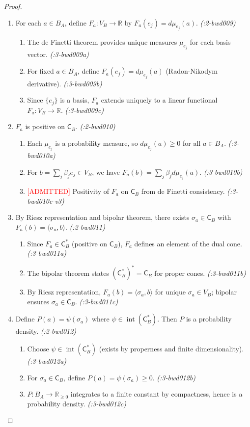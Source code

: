 \documentclass[11pt,a4paper]{article}
\theoremstyle{definition}
\theoremstyle{plain}
\newcommand{\proofstep}[2]{\item[$\langle #1 \rangle$#2.]}
\DeclareMathOperator{\inte}{int}
\newcommand{\C}{\mathsf{C}}
\begin{document}
\begin{proof}
\begin{enumerate}[leftmargin=2em]
\proofstep{1}{9} For each $a \in B_A$, define $F_a: V_B \to \mathbb{R}$ by $F_a(e_j) = d\mu_{e_j}(a)$. \textit{(:2-bwd009)}
\begin{enumerate}[leftmargin=1.5em, label=$\langle 2.\alph* \rangle$]
\item The de Finetti theorem provides unique measures $\mu_{e_j}$ for each basis vector. \textit{(:3-bwd009a)}
\item For fixed $a \in B_A$, define $F_a(e_j) = d\mu_{e_j}(a)$ (Radon-Nikodym derivative). \textit{(:3-bwd009b)}
\item Since $\{e_j\}$ is a basis, $F_a$ extends uniquely to a linear functional $F_a: V_B \to \mathbb{R}$. \textit{(:3-bwd009c)}
\end{enumerate}

\proofstep{1}{10} $F_a$ is positive on $\C_B$. \textit{(:2-bwd010)}
\begin{enumerate}[leftmargin=1.5em, label=$\langle 2.\alph* \rangle$]
\item Each $\mu_{e_j}$ is a probability measure, so $d\mu_{e_j}(a) \geq 0$ for all $a \in B_A$. \textit{(:3-bwd010a)}
\item For $b = \sum_j \beta_j e_j \in V_B$, we have $F_a(b) = \sum_j \beta_j d\mu_{e_j}(a)$. \textit{(:3-bwd010b)}
\item \textcolor{red}{[ADMITTED]} Positivity of $F_a$ on $\C_B$ from de Finetti consistency. \textit{(:3-bwd010c-v3)}
\end{enumerate}

\proofstep{1}{11} By Riesz representation and bipolar theorem, there exists $\sigma_a \in \C_B$ with $F_a(b) = \langle \sigma_a, b \rangle$. \textit{(:2-bwd011)}
\begin{enumerate}[leftmargin=1.5em, label=$\langle 2.\alph* \rangle$]
\item Since $F_a \in \C_B^*$ (positive on $\C_B$), $F_a$ defines an element of the dual cone. \textit{(:3-bwd011a)}
\item The bipolar theorem states $(\C_B^*)^* = \C_B$ for proper cones. \textit{(:3-bwd011b)}
\item By Riesz representation, $F_a(b) = \langle \sigma_a, b \rangle$ for unique $\sigma_a \in V_B$; bipolar ensures $\sigma_a \in \C_B$. \textit{(:3-bwd011c)}
\end{enumerate}

\proofstep{1}{12} Define $P(a) = \psi(\sigma_a)$ where $\psi \in \inte(\C_B^*)$. Then $P$ is a probability density. \textit{(:2-bwd012)}
\begin{enumerate}[leftmargin=1.5em, label=$\langle 2.\alph* \rangle$]
\item Choose $\psi \in \inte(\C_B^*)$ (exists by properness and finite dimensionality). \textit{(:3-bwd012a)}
\item For $\sigma_a \in \C_B$, define $P(a) = \psi(\sigma_a) \geq 0$. \textit{(:3-bwd012b)}
\item $P: B_A \to \mathbb{R}_{\geq 0}$ integrates to a finite constant by compactness, hence is a probability density. \textit{(:3-bwd012c)}
\end{enumerate}


\end{enumerate}
\end{proof}
\end{document}
